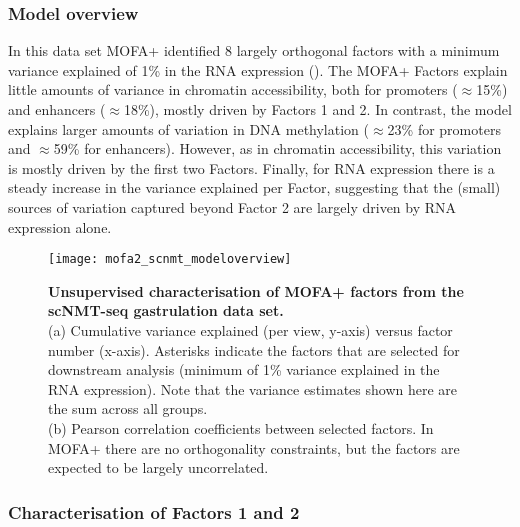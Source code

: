 \subsubsection{Model overview}

In this data set MOFA+ identified 8 largely orthogonal factors with a minimum variance explained of 1\% in the RNA expression (). The MOFA+ Factors explain little amounts of variance in chromatin accessibility, both for promoters ($\approx$15\%) and enhancers ($\approx$18\%), mostly driven by Factors 1 and 2. In contrast, the model explains larger amounts of variation in DNA methylation ($\approx$23\% for promoters and $\approx$59\% for enhancers). However, as in chromatin accessibility, this variation is mostly driven by the first two Factors. Finally, for RNA expression there is a steady increase in the variance explained per Factor, suggesting that the (small) sources of variation captured beyond Factor 2 are largely driven by RNA expression alone.

\begin{figure}[H]
	\centering
	\texttt{[image: mofa2\_scnmt\_modeloverview]}
	\caption[]{
	\textbf{Unsupervised characterisation of MOFA+ factors from the scNMT-seq gastrulation data set.} \\
	(a) Cumulative variance explained (per view, y-axis) versus factor number (x-axis). Asterisks indicate the factors that are selected for downstream analysis (minimum of 1\% variance explained in the RNA expression). Note that the variance estimates shown here are the sum across all groups. \\
	(b) Pearson correlation coefficients between selected factors. In MOFA+ there are no orthogonality constraints, but the factors are expected to be largely uncorrelated.
	}
	\label{fig:mofa2_scnmt_modeloverview}
\end{figure}


\subsubsection{Characterisation of Factors 1 and 2}

